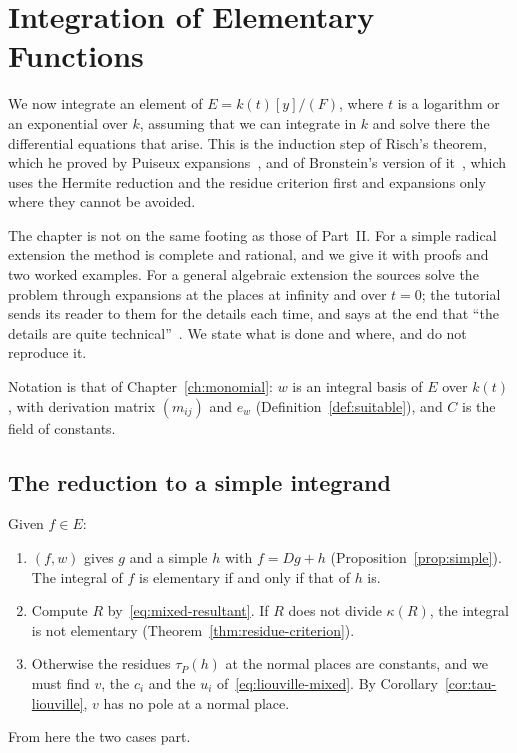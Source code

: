\chapter{Integration of Elementary Functions}\label{ch:elementary}

We now integrate an element of $E = k(t)[y]/(F)$, where $t$ is a logarithm or
an exponential over $k$, assuming that we can integrate in $k$ and solve
there the differential equations that arise. This is the induction step of
Risch's theorem, which he proved by Puiseux
expansions~\cite[pp.~203--220]{raab2022}, and of Bronstein's version of
it~\cite[Part~2]{bronstein1990}, which uses the Hermite reduction and the
residue criterion first and expansions only where they cannot be avoided.

The chapter is not on the same footing as those of Part~II. For a simple
radical extension the method is complete and rational, and we give it with
proofs and two worked examples. For a general algebraic extension the
sources solve the problem through expansions at the places at infinity and
over $t = 0$; the tutorial sends its reader to them for the details each
time, and says at the end that ``the details are quite
technical''~\cite[\S3.8 and \S3.9]{bronstein1998tutorial}. We state what is
done and where, and do not reproduce it.

Notation is that of Chapter~\ref{ch:monomial}: $w$ is an integral basis of
$E$ over $k(t)$, with derivation matrix $(m_{ij})$ and $e_w$
(Definition~\ref{def:suitable}), and $C$ is the field of constants.

\section{The reduction to a simple integrand}\label{sec:elem-reduction}

Given $f \in E$:
\begin{enumerate}
\item {}$(f, w)$ gives $g$ and a simple $h$ with $f = Dg +
  h$ (Proposition~\ref{prop:simple}). The integral of $f$ is elementary if
  and only if that of $h$ is.
\item Compute $R$ by~\eqref{eq:mixed-resultant}. If $R$ does not divide
  $\kappa(R)$, the integral is not elementary
  (Theorem~\ref{thm:residue-criterion}).
\item Otherwise the residues $\tau_P(h)$ at the normal places are constants,
  and we must find $v$, the $c_i$ and the $u_i$
  of~\eqref{eq:liouville-mixed}. By Corollary~\ref{cor:tau-liouville}, $v$ has
  no pole at a normal place.
\end{enumerate}
From here the two cases part.

